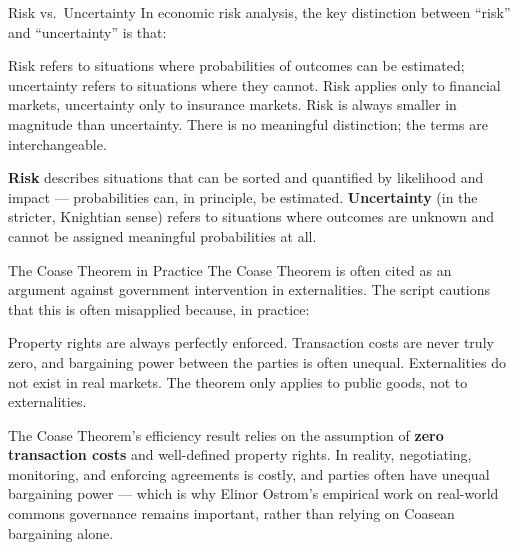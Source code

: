 \begin{question}[type=mc]{Risk vs.\ Uncertainty}
In economic risk analysis, the key distinction between ``risk'' and
``uncertainty'' is that:
\begin{choices}
  \correctchoice Risk refers to situations where probabilities of outcomes
                 can be estimated; uncertainty refers to situations where
                 they cannot.
  \choice        Risk applies only to financial markets, uncertainty only to
                 insurance markets.
  \choice        Risk is always smaller in magnitude than uncertainty.
  \choice        There is no meaningful distinction; the terms are
                 interchangeable.
  
\end{choices}
\begin{solution}
  \textbf{Risk} describes situations that can be sorted and quantified by
  likelihood and impact — probabilities can, in principle, be estimated.
  \textbf{Uncertainty} (in the stricter, Knightian sense) refers to
  situations where outcomes are unknown and cannot be assigned meaningful
  probabilities at all.
\end{solution}
\end{question}

\begin{question}[type=mc]{The Coase Theorem in Practice}
The Coase Theorem is often cited as an argument against government
intervention in externalities. The script cautions that this is often
misapplied because, in practice:
\begin{choices}
  \choice        Property rights are always perfectly enforced.
  \correctchoice Transaction costs are never truly zero, and bargaining power
                 between the parties is often unequal.
  \choice        Externalities do not exist in real markets.
  \choice        The theorem only applies to public goods, not to
                 externalities.
\end{choices}
\begin{solution}
  The Coase Theorem's efficiency result relies on the assumption of
  \textbf{zero transaction costs} and well-defined property rights. In
  reality, negotiating, monitoring, and enforcing agreements is costly, and
  parties often have unequal bargaining power — which is why Elinor Ostrom's
  empirical work on real-world commons governance remains important, rather
  than relying on Coasean bargaining alone.
\end{solution}
\end{question}

